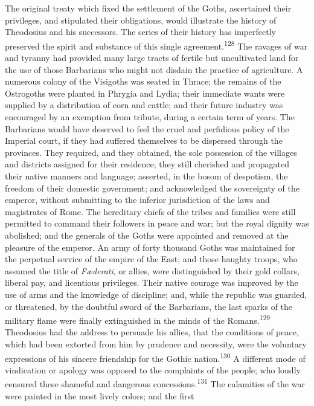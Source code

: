 The original treaty which fixed the settlement of the Goths,
ascertained their privileges, and stipulated their obligations,
would illustrate the history of Theodosius and his successors.
The series of their history has imperfectly preserved the spirit
and substance of this single agreement.\textsuperscript{128} The ravages of war
and tyranny had provided many large tracts of fertile but
uncultivated land for the use of those Barbarians who might not
disdain the practice of agriculture. A numerous colony of the
Visigoths was seated in Thrace; the remains of the Ostrogoths
were planted in Phrygia and Lydia; their immediate wants were
supplied by a distribution of corn and cattle; and their future
industry was encouraged by an exemption from tribute, during a
certain term of years. The Barbarians would have deserved to feel
the cruel and perfidious policy of the Imperial court, if they
had suffered themselves to be dispersed through the provinces.
They required, and they obtained, the sole possession of the
villages and districts assigned for their residence; they still
cherished and propagated their native manners and language;
asserted, in the bosom of despotism, the freedom of their
domestic government; and acknowledged the sovereignty of the
emperor, without submitting to the inferior jurisdiction of the
laws and magistrates of Rome. The hereditary chiefs of the tribes
and families were still permitted to command their followers in
peace and war; but the royal dignity was abolished; and the
generals of the Goths were appointed and removed at the pleasure
of the emperor. An army of forty thousand Goths was maintained
for the perpetual service of the empire of the East; and those
haughty troops, who assumed the title of \textit{Fæderati}, or allies,
were distinguished by their gold collars, liberal pay, and
licentious privileges. Their native courage was improved by the
use of arms and the knowledge of discipline; and, while the
republic was guarded, or threatened, by the doubtful sword of the
Barbarians, the last sparks of the military flame were finally
extinguished in the minds of the Romans.\textsuperscript{129} Theodosius had the
address to persuade his allies, that the conditions of peace,
which had been extorted from him by prudence and necessity, were
the voluntary expressions of his sincere friendship for the
Gothic nation.\textsuperscript{130} A different mode of vindication or apology was
opposed to the complaints of the people; who loudly censured
these shameful and dangerous concessions.\textsuperscript{131} The calamities of
the war were painted in the most lively colors; and the first
